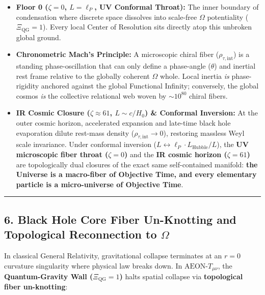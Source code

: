 \documentclass[
]{article}
\providecommand{\tightlist}{%
  \setlength{\itemsep}{0pt}\setlength{\parskip}{0pt}}
\begin{document}
\begin{itemize}
\tightlist
\item
  \textbf{Floor 0 (\(\zeta = 0\), \(L = \ell_P\), UV Conformal Throat):}
  The inner boundary of condensation where discrete space dissolves into
  scale-free \(\Omega\) potentiality (\(\Xi_{\text{QG}} = 1\)). Every
  local Center of Resolution sits directly atop this unbroken global
  ground.
\item
  \textbf{Chronometric Mach's Principle:} A microscopic chiral fiber
  (\(\rho_{\tau,\text{int}}\)) is a standing phase-oscillation that can
  only define a phase-angle (\(\theta\)) and inertial rest frame
  relative to the globally coherent \(\Omega\) whole. Local inertia
  \emph{is} phase-rigidity anchored against the global Functional
  Infinity; conversely, the global cosmos \emph{is} the collective
  relational web woven by \(\sim 10^{80}\) chiral fibers.
\item
  \textbf{IR Cosmic Closure (\(\zeta \approx 61\), \(L \sim c/H_0\)) \&
  Conformal Inversion:} At the outer cosmic horizon, accelerated
  expansion and late-time black hole evaporation dilute rest-mass
  density (\(\rho_{\tau,\text{int}} \to 0\)), restoring massless Weyl
  scale invariance. Under conformal inversion
  (\(L \leftrightarrow \ell_P \cdot L_{\text{Hubble}} / L\)), the
  \textbf{UV microscopic fiber throat (\(\zeta = 0\))} and the
  \textbf{IR cosmic horizon (\(\zeta = 61\))} are topologically dual
  closures of the exact same self-contained manifold: \textbf{the
  Universe is a macro-fiber of Objective Time, and every elementary
  particle is a micro-universe of Objective Time}.
\end{itemize}

\begin{center}\rule{0.5\linewidth}{0.5pt}\end{center}

\subsection{\texorpdfstring{6. Black Hole Core Fiber Un-Knotting and
Topological Reconnection to
\(\Omega\)}{6. Black Hole Core Fiber Un-Knotting and Topological Reconnection to \textbackslash Omega}}\label{black-hole-core-fiber-un-knotting-and-topological-reconnection-to-omega}

In classical General Relativity, gravitational collapse terminates at an
\(r = 0\) curvature singularity where physical law breaks down. In
\(\text{AEON-}T_{\mu\nu}\), the \textbf{Quantum-Gravity Wall
(\(\Xi_{\text{QG}} = 1\))} halts spatial collapse via
\textbf{topological fiber un-knotting}:
\end{document}
